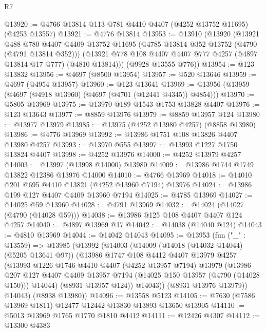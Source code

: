\begin{lexlean}{R7}
\begin{coremodule}
@13920 := @4766 @13814 @113 @781 @4410 @4407 (@4252 @13752 @11695) (@4253 @13557)
@13921 := @4776 @13814
@13953 := @13910
    (@13920
      (@13921
        @488
        @780
        @4407
        @4409
        @13752
        @11695
        (@4785 @13814 @352 @13752 (@4790 (@4791 @13814 @352)))
        (@13921 @778 @108 @4407 @4407 @777 @4257 (@4897 @13814 @17 @777) (@4810 @13814)))
      (@9928 @13555 @776))
@13954 := @123 @13832
@13956 := @4697 (@8500 @13954)
@13957 := @520 @13646
@13959 := @4697 (@4954 @13957)
@13960 := @123 @13641
@13969 := @13956 (@13959 (@4697 (@4918 @13960) (@4697 (@4701 (@12441 @4345)) @4854)))
@13970 := @5805 @13969
@13975 := @13970 @189 @1543 @1753 @13828 @4407
@13976 := @123 @13643
@13977 := @8859 @13976
@13979 := @8859 @13957 @124
@13980 := @13977 @13979
@13985 := @13975 (@4252 @13980 @4257) (@8858 @13980)
@13986 := @4776 @13969
@13992 := @13986 @1751 @108 @13826 @4407 @13980 @4257
@13993 := @13970 @555
@13997 := @13993 @1227 @1750 @13824 @4407
@13998 := @4252 @13976
@14000 := @4252 @13979 @4257
@14003 := @13997 (@13998 @14000) @13980
@14009 := @13986 @1744 @1749 @13822 @12386 @13976 @14000
@14010 := @4766 @13969
@14018 := @14010 @201 @695 @4410 @13821 (@4252 @13960 @7194) @13976
@14024 := @13986 @199 @127 @4407 @4409 @13960 @7194
@14025 := @4785 @13969
@14027 := @14025 @59 @13960
@14028 := @4791 @13969
@14032 := @14024 (@14027 (@4790 (@14028 @59)))
@14038 := @13986 @125 @108 @4407 @4407 @124 @4257
@14040 := @4897 @13969 @17
@14042 := @14038 (@14040 @124)
@14043 := @4810 @13969
@14044 := @14042 @14043
@14095 := @13953
    (fun ("_" : @13559) =>
    @13985
      (@13992
        (@14003
          (@14009
            (@14018 (@14032 @14044) (@5205 @13641 @97))
            (@13986
              @1747
              @108
              @4412
              @4407
              @13979
              @4257
              (@13993
                @1226
                @1746
                @4410
                @4407
                (@4252 @13957 @7194)
                @13979
                (@13986
                  @207
                  @127
                  @4407
                  @4409
                  @13957
                  @7194
                  (@14025 @150 @13957 (@4790 (@14028 @150)))
                  @14044)
                (@8931 @13957 @124))
              @14043))
          (@8931 @13976 @13979))
        @14043)
      (@8938 @13980))
@14096 := @13558 @5123
@14105 := @7630 (@7586 @13969 @1811) @12477 @12442 @13830 @13893 @13650 @13905
@14110 := @5013 @13969 @1765 @1770 @1810 @4412
@14111 := @12426 @4307
@14112 := @13300 @4383

\end{coremodule}
\end{lexlean}
